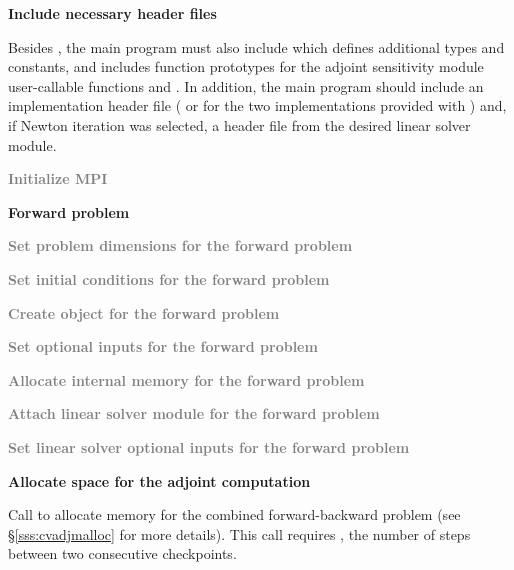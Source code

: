 \begin{Steps}

\item
  {\bf Include necessary header files}
  
  Besides , the main program must also include
   which defines additional types and constants, and includes
  function prototypes for the adjoint sensitivity module user-callable functions and
  . In addition, the main program should include an {\nvector} 
  implementation header file ( or 
  for the two implementations provided with {\cvodes}) and, if Newton iteration 
  was selected, a header file from the desired linear solver module.

\item
  \textcolor{gray}{\bf {\p} Initialize MPI}

  \vspace{0.2in}\centerline{\bf Forward problem}

\item
  \textcolor{gray}{\bf Set problem dimensions for the forward problem}

\item
  \textcolor{gray}{\bf Set initial conditions for the forward problem}

\item
  \textcolor{gray}{\bf Create {\cvodes} object for the forward problem}

\item
  \textcolor{gray}{\bf Set optional inputs for the forward problem}

\item
  \textcolor{gray}{\bf Allocate internal memory for the forward problem}

\item
  \textcolor{gray}{\bf Attach linear solver module for the forward problem}

\item
  \textcolor{gray}{\bf Set linear solver optional inputs for the forward problem}

\item
  {\bf Allocate space for the adjoint computation}

  Call \id{()} to allocate memory for the 
  combined forward-backward problem (see \S\ref{sss:cvadjmalloc} for more details). 
  This call requires , the number of steps between two consecutive checkpoints.


\end{Steps}
